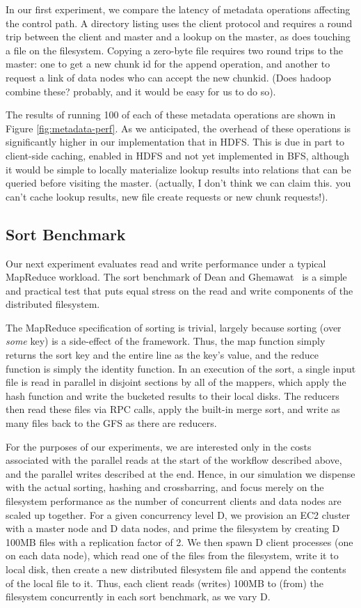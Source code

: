 \documentclass{article}
\begin{document}
In our first experiment, we compare the latency of metadata operations
affecting the control path.  A directory listing uses the client
protocol and requires a round trip between the client and master and a
lookup on the master, as does touching a file on the filesystem.
Copying a zero-byte file requires two round trips to the master: one
to get a new chunk id for the append operation, and another to request
a link of data nodes who can accept the new chunkid.  (Does hadoop
combine these?  probably, and it would be easy for us to do so).

The results of running 100 of each of these metadata operations are
shown in Figure \ref{fig:metadata-perf}.  As we anticipated, the
overhead of these operations is significantly higher in our
implementation that in HDFS.  This is due in part to client-side
caching, enabled in HDFS and not yet implemented in BFS, although it
would be simple to locally materialize lookup results into relations
that can be queried before visiting the master. (actually, I don't
think we can claim this.  you can't cache lookup results, new file
create requests or new chunk requests!).

\subsection{Sort Benchmark}
Our next experiment evaluates read and write performance under a
typical MapReduce workload.  The sort benchmark of Dean and
Ghemawat~\cite{mapreduce} is a simple and practical test that puts
equal stress on the read and write components of the distributed
filesystem.

The MapReduce specification of sorting is trivial, largely because
sorting (over \emph{some} key) is a side-effect of the framework.
Thus, the map function simply returns the sort key and the entire line
as the key's value, and the reduce function is simply the identity
function.  In an execution of the sort, a single input file is read in
parallel in disjoint sections by all of the mappers, which apply the
hash function and write the bucketed results to their local disks.
The reducers then read these files via RPC calls, apply the built-in
merge sort, and write as many files back to the GFS as there are
reducers.

For the purposes of our experiments, we are interested only in the
costs associated with the parallel reads at the start of the workflow
described above, and the parallel writes described at the end.  Hence,
in our simulation we dispense with the actual sorting, hashing and
crossbarring, and focus merely on the filesystem performance as the
number of concurrent clients and data nodes are scaled up together.
For a given concurrency level D, we provision an EC2 cluster with a
master node and D data nodes, and prime the filesystem by creating D
100MB files with a replication factor of 2.  We then spawn D client
processes (one on each data node), which read one of the files from the
filesystem, write it to local disk, then create a new distributed
filesystem file and append the contents of the local file to it.
Thus, each client reads (writes) 100MB to (from) the filesystem
concurrently in each sort benchmark, as we vary D.
\end{document}
